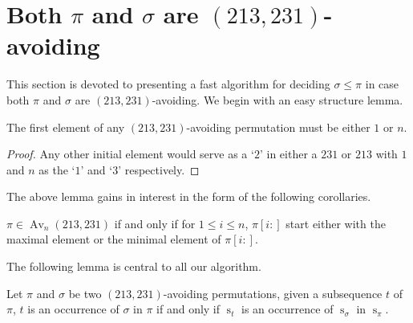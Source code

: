 \documentclass[a4paper]{llncs}
\DeclareMathOperator{\AV}{Av}
\DeclareMathOperator{\Avd}{Av}
\newcommand\Av[2]{\Avd_{{#1}}({#2})}
\newcommand{\ptext}{\pi}
\newcommand{\pmotif}{\sigma}
\DeclareMathOperator{\stripea}{s}
\newcommand{\stripe}[2]{\stripea_{{#1}}[{#2}]}
\newcommand{\stripew}[1]{\stripea_{{#1}}}
\newcommand{\dstep}{d}
\newcommand{\ustep}{a}
\begin{document}

\section{Both $\pi$ and $\sigma$ are $(213,231)$-avoiding}
\label{section:both are (231,213)-avoiding}

This section is devoted to presenting a fast algorithm for deciding
$\sigma \leq \pi$ 
in case both $\pi$ and $\sigma$ are $(213,231)$-avoiding.
We begin with an easy structure lemma.

\begin{lemma}[Folklore]
\label{lemma:first element is 1 or n}
The first element of any $(213,231)$-avoiding permutation
must be either $1$ or $n$.
\end{lemma}

\begin{proof} 
Any other initial element would serve as a `$2$' in either a 
$231$ or $213$ with $1$ and $n$ as the `$1$' and `$3$' respectively.
\end{proof}
	
The above lemma gains in interest in the form of the following corollaries.

\begin{corollary}
\label{corollary:minmaxelement}
$\pi \in \AV_n(213,231)$ if and only if for $1 \leq i \leq n$, 
$\pi[i:]$ start either with the maximal element
or the minimal element of $\pi[i:]$.
\end{corollary}

%

The following lemma is central to all our algorithm.

\begin{lemma}
\label{lemma:MatchStripeToPermutation}
Let $\pi$ and $\sigma$ be two $(213,231)$-avoiding permutations, given a subsequence $t$ of $\ptext$, $t$ is an occurrence of $\pmotif$ in $\ptext$ if and only if $\stripew{t}$ is an occurrence of $\stripew{\pmotif}$ in $\stripew{\ptext}$.
\end{lemma}	 
	 
\end{document}
